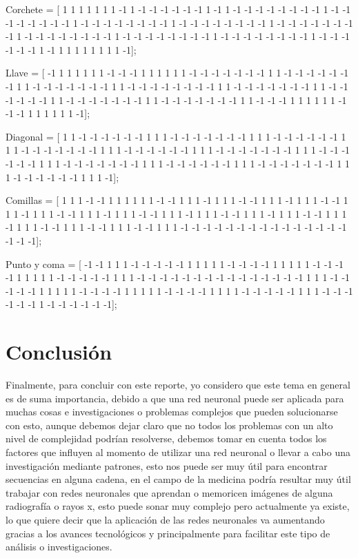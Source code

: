 \documentclass[12pt]{article}
\begin{document}
Corchete = [ 1 1 1 1 1 1 1 -1 1 -1 -1 -1 -1 -1 -1 1 -1 1 -1 -1 -1 -1 -1 -1 -1 -1 1 -1 -1 -1 -1 -1 -1 -1 -1 1 -1 -1 -1 -1 -1 -1 -1 -1 1 -1 -1 -1 -1 -1 -1 -1 -1 1 -1 -1 -1 -1 -1 -1 -1 -1 1 -1 -1 -1 -1 -1 -1 -1 -1 1 -1 -1 -1 -1 -1 -1 -1 -1 1 -1 -1 -1 -1 -1 -1 -1 -1 1 -1 -1 -1 -1 -1 -1 1 -1 1 1 1 1 1 1 1 1 -1];

Llave = [ -1 1 1 1 1 1 1 -1 -1 -1 1 1 1 1 1 1 -1 -1 -1 -1 -1 -1 -1 1 1 -1 -1 -1 -1 -1 -1 -1 1 1 -1 -1 -1 -1 -1 -1 -1 1 1 -1 -1 -1 -1 -1 -1 -1 -1 1 1 -1 -1 -1 -1 -1 -1 -1 1 1 -1 -1 -1 -1 -1 -1 1 1 -1 -1 -1 -1 -1 -1 -1 1 1 -1 -1 -1 -1 -1 -1 -1 1 1 -1 -1 -1 1 1 1 1 1 1 -1 -1 -1 1 1 1 1 1 1 -1];

Diagonal = [ 1 1 -1 -1 -1 -1 -1 -1 1 1 1 -1 -1 -1 -1 -1 -1 -1 1 1 1 -1 -1 -1 -1 -1 -1 1 1 1 -1 -1 -1 -1 -1 -1 -1 1 1 1 -1 -1 -1 -1 -1 -1 1 1 1 -1 -1 -1 -1 -1 -1 -1 1 1 1 -1 -1 -1 -1 -1 -1 1 1 1 -1 -1 -1 -1 -1 -1 -1 1 1 1 -1 -1 -1 -1 -1 -1 1 1 1 -1 -1 -1 -1 -1 -1 -1 1 1 1 -1 -1 -1 -1 -1 -1 1 1 1 -1];

Comillas = [ 1 1 1 -1 -1 1 1 1 1 1 1 -1 -1 1 1 1 -1 1 1 1 -1 -1 1 1 1 -1 1 1 1 -1 -1 1 1 1 -1 1 1 1 -1 -1 1 1 1 -1 1 1 1 -1 -1 1 1 1 -1 1 1 1 -1 -1 1 1 1 -1 1 1 1 -1 -1 1 1 1 -1 1 1 1 -1 -1 1 1 1 -1 -1 1 1 1 -1 -1 1 1 1 -1 -1 -1 -1 -1 -1 -1 -1 -1 -1 -1 -1 -1 -1 -1 -1 -1 -1];

Punto y coma = [ -1 -1 1 1 1 -1 -1 -1 -1 -1 1 1 1 1 1 -1 -1 -1 -1 1 1 1 1 1 -1 -1 -1 -1 1 1 1 1 1 -1 -1 -1 -1 -1 1 1 1 -1 -1 -1 -1 -1 -1 -1 -1 -1 -1 -1 -1 -1 -1 -1 1 1 1 -1 -1 -1 -1 -1 1 1 1 1 1 -1 -1 -1 -1 1 1 1 1 1 -1 -1 -1 -1 1 1 1 1 -1 -1 -1 -1 -1 1 1 1 -1 -1 -1 -1 -1 -1 1 -1 -1 -1 -1 -1 -1];

\pagebreak

\section*{\Huge{Conclusión}}

Finalmente, para concluir con este reporte, yo considero que este tema en general es de suma importancia, debido a que una red neuronal puede ser aplicada para muchas cosas e investigaciones o problemas complejos que pueden solucionarse con esto, aunque debemos dejar claro que no todos los problemas con un alto nivel de complejidad podrían resolverse, debemos tomar en cuenta todos los factores que influyen al momento de utilizar una red neuronal o llevar a cabo una investigación mediante patrones, esto nos puede ser muy útil para encontrar secuencias en alguna cadena, en el campo de la medicina podría resultar muy útil trabajar con redes neuronales que aprendan o memoricen imágenes de alguna radiografía o rayos x, esto puede sonar muy complejo pero actualmente ya existe, lo que quiere decir que la aplicación de las redes neuronales va aumentando gracias a los avances tecnológicos y principalmente para facilitar este tipo de análisis o investigaciones.
\end{document}
